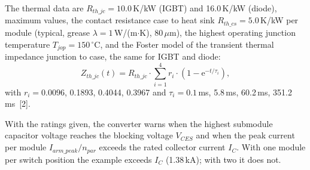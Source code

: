 The thermal data are $R_{th\_jc} = 10.0$\,K/kW (IGBT) and 16.0\,K/kW (diode), maximum values, the contact resistance
case to heat sink $R_{th\_cs} = 5.0$\,K/kW per module (typical, grease $\lambda = 1$\,W/(m$\cdot$K), 80\,$\mu$m), the
highest operating junction temperature $T_{jop} = 150\,^{\circ}$C, and the Foster model of the transient thermal
impedance junction to case, the same for IGBT and diode:
\begin{equation}
  Z_{th\_jc}(t) = R_{th\_jc} \cdot \sum_{i=1}^{4} r_i \cdot \left( 1 - \mathrm{e}^{-t/\tau_i} \right) ,
\end{equation}
with $r_i = 0.0096$, 0.1893, 0.4044, 0.3967 and $\tau_i = 0.1$\,ms, 5.8\,ms, 60.2\,ms, 351.2\,ms~[2].

With the ratings given, the converter warns when the highest submodule capacitor voltage reaches the blocking
voltage $V_{CES}$ and when the peak current per module $I_{arm\_peak} / n_{par}$ exceeds the rated collector current
$I_C$. With one module per switch position the example exceeds $I_C$ (1.38\,kA); with two it does not.
